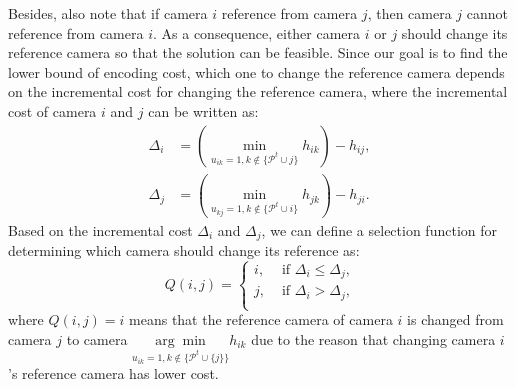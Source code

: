 Besides, also note that if camera $i$ reference from camera $j$, then camera $j$ cannot reference from camera $i$.
As a consequence, either camera $i$ or $j$ should change its reference camera so that the solution can be feasible.
Since our goal is to find the lower bound of encoding cost, which one to change the reference camera depends on the incremental cost for changing the reference camera, where the incremental cost of camera $i$ and $j$ can be written as:
\begin{align}
\Delta_i &= \left( \underset{u_{ik}=1, k \notin \{\mathcal{P}^t \cup j\}}{\min} h_{ik} \right) - h_{ij}, \nonumber \\
\Delta_j &= \left( \underset{u_{kj}=1, k \notin \{\mathcal{P}^t \cup i\}}{\min} h_{jk} \right) - h_{ji}.
\end{align}
Based on the incremental cost $\Delta_i$ and $\Delta_j$, we can define a selection function for determining which camera should change its reference as:
\begin{equation}
Q(i,j) = 
\left\{ \begin{array}{ll}
i,  &\text{ if $\Delta_i \leq \Delta_j$,} \\                  	   
j,  &\text{ if $\Delta_i > \Delta_j$,} \\
\end{array} \right.
\label{eq::selectionFunctionQ}
\end{equation}
where $Q(i,j) = i$ means that the reference camera of camera $i$ is changed from camera $j$ to camera $\underset{u_{ik}=1, k \notin \{\mathcal{P}^t \cup\{j\}\}}{\arg \min} h_{ik}$ due to the reason that changing camera $i$'s reference camera has lower cost.

